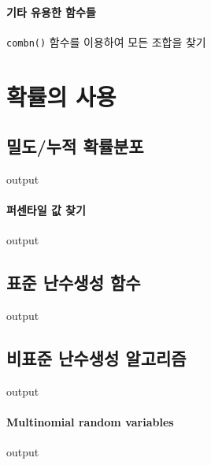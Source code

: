 \documentclass{book}
\begin{document}
\paragraph{기타 유용한 함수들}
\texttt{combn()} 함수를 이용하여 모든 조합을 찾기

\section{확률의 사용}

\subsection{밀도/누적 확률분포}
\begin{Schunk}
\begin{Soutput}
output
\end{Soutput}
\end{Schunk}

\paragraph{퍼센타일 값 찾기}
\begin{Schunk}
\begin{Soutput}
output
\end{Soutput}
\end{Schunk}

\subsection{표준 난수생성 함수}
\begin{Schunk}
\begin{Soutput}
output
\end{Soutput}
\end{Schunk}

\subsection{비표준 난수생성 알고리즘}
\begin{Schunk}
\begin{Soutput}
output
\end{Soutput}
\end{Schunk}
\paragraph{Multinomial random variables}
\begin{Schunk}
\begin{Soutput}
output
\end{Soutput}
\end{Schunk}
\end{document}
